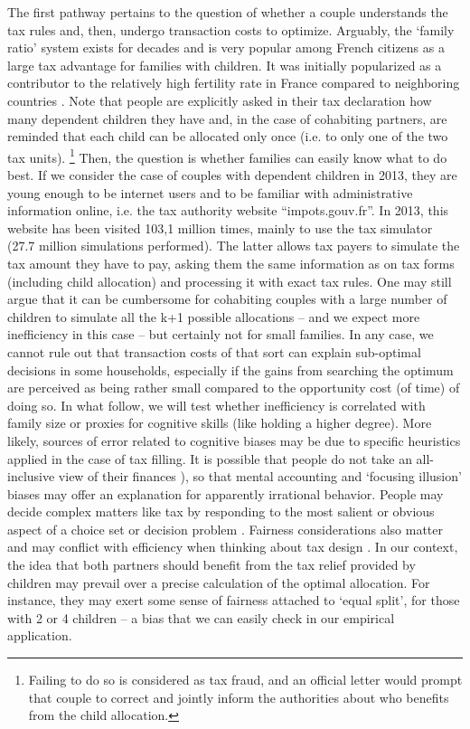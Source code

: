The first pathway pertains to the question of whether a couple understands the tax rules and, then, undergo transaction costs to optimize. Arguably, the `family ratio’ system exists for decades and is very popular among French citizens as a large tax advantage for families with children. It was initially popularized as a contributor to the relatively high fertility rate in France compared to neighboring countries \citep{landais2004quotient}. Note that people are explicitly asked in their tax declaration how many dependent children they have and, in the case of cohabiting partners, are reminded that each child can be allocated only once (i.e. to only one of the two tax units). \footnote{
    Failing to do so is considered as tax fraud, and an official letter would prompt that couple to correct and jointly inform the authorities about who benefits from the child allocation.}
Then, the question is whether families can easily know what to do best. If we consider the case of couples with dependent children in 2013, they are young enough to be internet users and to be familiar with administrative information online, i.e. the tax authority website “impots.gouv.fr”.
In 2013, this website has been visited 103,1 million times, mainly to use the tax simulator (27.7 million simulations performed). The latter allows tax payers to simulate the tax amount they have to pay, asking them the same information as on tax forms (including child allocation) and processing it with exact tax rules. One may still argue that it can be cumbersome for cohabiting couples with a large number of children to simulate all the k+1 possible allocations – and we expect more inefficiency in this case – but certainly not for small families. In any case, we cannot rule out that transaction costs of that sort can explain sub-optimal decisions in some households, especially if the gains from searching the optimum are perceived as being rather small compared to the opportunity cost (of time) of doing so. In what follow, we will test whether inefficiency is correlated with family size or proxies for cognitive skills (like holding a higher degree).
More likely, sources of error related to cognitive biases may be due to specific heuristics applied in the case of tax filling. It is possible that people do not take an all-inclusive view of their finances  \citep{thaler1999mental}), so that mental accounting and `focusing illusion’ biases may offer an explanation for apparently irrational behavior. People may decide complex matters like tax by responding to the most salient or obvious aspect of a choice set or decision problem \citep{chetty2009salience,mccaffery2004framing}.  Fairness considerations also matter and may conflict with efficiency when thinking about tax design \citep{mccaffery2003heuristics}. In our context, the idea that both partners should benefit from the tax relief provided by children may prevail over a precise calculation of the optimal allocation. For instance, they may exert some sense of fairness attached to `equal split’, for those with 2 or 4 children – a bias that we can easily check in our empirical application. 

